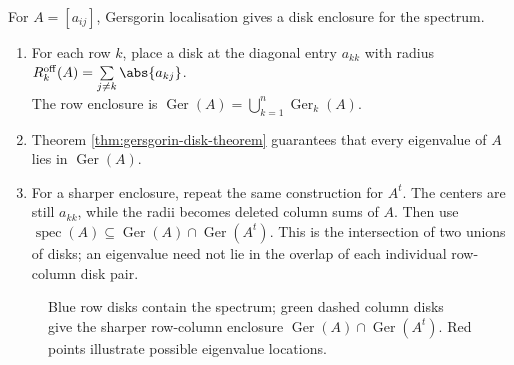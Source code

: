 \begin{method} \label{meth:gersgorin-disk-localisation} \\
For $A=[a_{ij}]$, Gersgorin localisation gives a disk enclosure for the spectrum.
\begin{enumerate}[label=(\roman*)]
\setlength{\itemsep}{0pt}
\item For each row $k$, place a disk at the diagonal entry $a_{kk}$ with radius $R_k^{\mathrm{off}}(A)=\sum\limits_{j\neq k}\abs{a_{kj}}$.\\
The row enclosure is $\operatorname{Ger}(A)=\bigcup_{k=1}^{n}\operatorname{Ger}_k(A)$.
\item Theorem \ref{thm:gersgorin-disk-theorem} guarantees that every eigenvalue of $A$ lies in $\operatorname{Ger}(A)$.
\item For a sharper enclosure, repeat the same construction for $A^t$. The centers are still $a_{kk}$, while the radii becomes deleted column sums of $A$. Then use $\operatorname{spec}(A)\subseteq \operatorname{Ger}(A)\cap \operatorname{Ger}(A^t)$.
This is the intersection of two unions of disks; an eigenvalue need not lie in the overlap of each individual row-column disk pair.
\end{enumerate}
\end{method}

\begin{figure}[H]
  \centering
  
  \caption{Blue row disks contain the spectrum; green dashed column disks give the sharper row-column enclosure $\operatorname{Ger}(A)\cap \operatorname{Ger}(A^t)$. Red points illustrate possible eigenvalue locations.}
  \label{fig:gersgorin-disk-method}
\end{figure}

